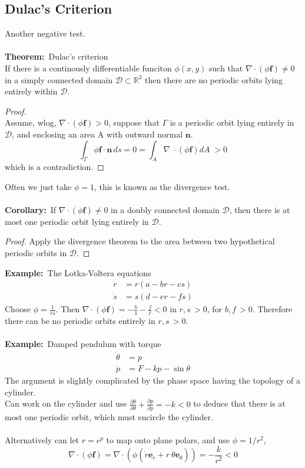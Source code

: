 \documentclass{article}
\newcommand{\domain}{\mathcal{D}}                           %
\newcommand{\example}{\textbf{Example:}}                    %
\newcommand{\theorem}{\textbf{Theorem:}}                    %
\newcommand{\corollary}{\textbf{Corollary:}}                %
\newcommand{\pder}[2] {\frac{\partial {#1}}{\partial {#2} }}%
\begin{document}
\subsection{Dulac's Criterion}
Another negative test.
\\
\\
\theorem\ Dulac's criterion
\\
If there is a continously differentiable funciton $\phi(x,y)$ such that
$\nabla \cdot ( \phi \bm{f}) \neq 0$ in a simply connected domain 
$\domain \subset \mathbb{R}^2$ then there are no periodic orbits lying
entirely within $\domain$.
\begin{proof} ~
\\
Assume, wlog, $\nabla \cdot ( \phi \bm{f} ) > 0$, suppose that $\Gamma$ is
a periodic orbit lying entirely in $\domain$, and enclosing an area A with
outward normal $\bm{n}$.
\[ \int_{\Gamma} \phi \bm{f} \cdot \bm{n} \, ds = 0 = \int_{A} \nabla \
\cdot ( \phi \bm{f} ) dA \; >0 \]
which is a contradiction.
\end{proof}
%
\noindent Often we just take $\phi = 1$, this is known as the divergence test.
\\
\\
\corollary\ If $\nabla \cdot ( \phi \bm{f}) \neq 0 $ in a doubly connected
domain $\domain$, then there is at most one periodic orbit lying entirely in
$\domain$.
\begin{proof}
Apply the divergence theorem to the area between two hypothetical periodic 
orbits in $\domain$.
\end{proof}
\noindent
\example\   The Lotka-Voltera equations
\begin{align*}
\dot{r} &= r(a - br -cs) \\
\dot{s} &= s(d - er -fs)
\end{align*}
Choose $\displaystyle \phi = \frac{1}{rs}$. Then $\displaystyle \nabla \cdot 
( \phi \bm{f}) = -\frac{b}{s} - \frac{f}{r} <0$ in $r,s \, >0$, for $b,f \, >0$.
Therefore there can be no periodic orbits entirely in $r,s \, > 0$.
\\
\\
\example\ Damped pendulum with torque
\\
\begin{align*}
\dot{\theta} &= p \\
\dot{p}      &= F - kp - \sin \theta
\end{align*}
The argument is slightly complicated by the phase space having the topology 
of a cylinder.
\\
Can work on the cylinder and use $\displaystyle \pder{\dot{\theta}}{\theta} +
\frac{\partial \dot{p}}{\partial p} = -k <0$ to deduce that there is at most one
periodic orbit, which must encircle the cylinder.
\\
\\
Alternatively can let $r = e^p$ to map onto plane polars, and use $\phi = 1/r^2$,
\[ \nabla \cdot (\phi \bm{f}) = \nabla \cdot ( \phi( \dot{r} \bm{e}_r + r \
\dot{\theta} \bm{e}_{\theta})) = -\frac{k}{r^2} < 0\]
\\
\\
\end{document}
